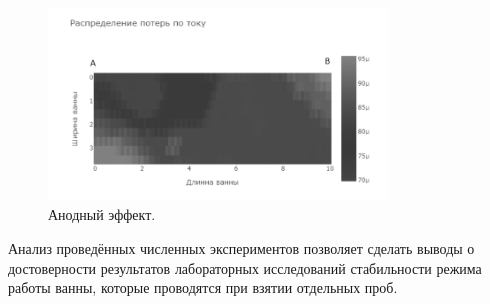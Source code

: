 \documentclass{article}
\begin{document}
\begin{figure}[h!]
    \centering
    \includegraphics[width=90mm]{анодный эффект.png}
    \caption{Анодный эффект.}
    \label{fig:} 
\end{figure}

Анализ проведённых численных экспериментов позволяет сделать выводы о достоверности результатов лабораторных исследований стабильности режима работы ванны, которые проводятся при взятии отдельных проб.

\begin{thebibliography}{}
\end{thebibliography}
\end{document}
